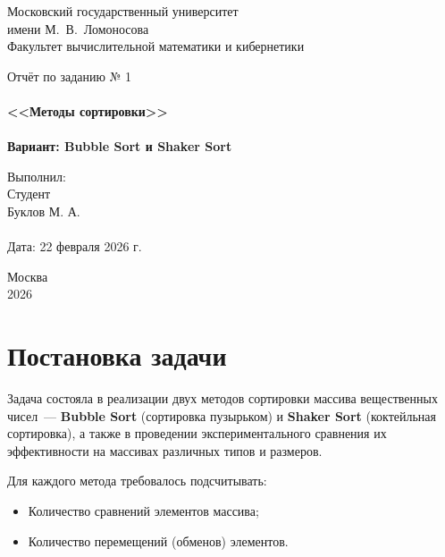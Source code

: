 \documentclass[a4paper,12pt,titlepage]{article}
\begin{document}
\begin{titlepage}
    \begin{center}
        {\small \sc Московский государственный университет \\
        имени М.~В.~Ломоносова\\
        Факультет вычислительной математики и кибернетики\\}
        
        \vfill
        
        {\Large \sc Отчёт по заданию № 1}\\
        ~\\
        {\large \bf <<Методы сортировки>>}\\ 
        ~\\
        {\large \bf Вариант: Bubble Sort и Shaker Sort}
    \end{center}
    
    \begin{flushright}
        \vfill 
        Выполнил:\\
        Студент\\
        Буклов М. А.\\
        ~\\
        Дата: 22 февраля 2026 г.
    \end{flushright}
    
    \begin{center}
        \vfill
        {\small Москва\\2026}
    \end{center}
\end{titlepage}

\tableofcontents
\newpage

\section{Постановка задачи}

Задача состояла в реализации двух методов сортировки массива вещественных чисел~--- \textbf{Bubble Sort} (сортировка пузырьком) и \textbf{Shaker Sort} (коктейльная сортировка), а также в проведении экспериментального сравнения их эффективности на массивах различных типов и размеров.

Для каждого метода требовалось подсчитывать:
\begin{itemize}
    \item Количество сравнений элементов массива;
    \item Количество перемещений (обменов) элементов.
\end{itemize}
\end{document}
